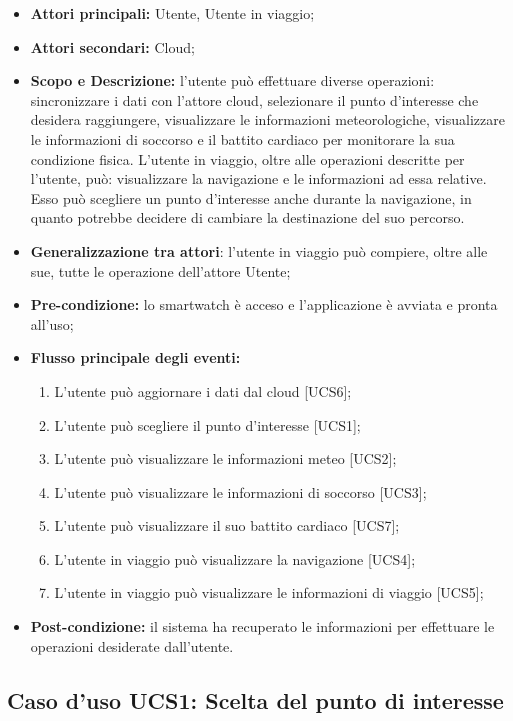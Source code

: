 \begin{itemize}
\item \textbf{Attori principali:} Utente, Utente in viaggio;
\item \textbf{Attori secondari:} Cloud;
\item \textbf{Scopo e Descrizione:} l'utente può effettuare diverse operazioni: sincronizzare i dati con l'attore cloud, selezionare il punto d'interesse che desidera raggiungere, visualizzare le informazioni meteorologiche, visualizzare le informazioni di soccorso e il battito cardiaco per monitorare la sua condizione fisica. L'utente in viaggio, oltre alle operazioni descritte per l'utente, può: visualizzare la navigazione e le informazioni ad essa relative. Esso può scegliere un punto d'interesse anche durante la navigazione, in quanto potrebbe decidere di cambiare la destinazione del suo percorso. 
\item \textbf{Generalizzazione tra attori}: l'utente in viaggio può compiere, oltre alle sue, tutte le operazione dell'attore Utente;
\item \textbf{Pre-condizione:} lo smartwatch è acceso e l'applicazione è avviata e pronta all'uso;
\item \textbf{Flusso principale degli eventi:}
\begin{enumerate}
\item L'utente può aggiornare i dati dal cloud [UCS6];
\item L'utente può scegliere il punto d'interesse [UCS1];
\item L'utente può visualizzare le informazioni meteo [UCS2];
\item L'utente può visualizzare le informazioni di soccorso [UCS3];
\item L'utente può visualizzare il suo battito cardiaco [UCS7];
\item L'utente in viaggio può visualizzare la navigazione [UCS4];
\item L'utente in viaggio può visualizzare le informazioni di viaggio [UCS5];
\end{enumerate}
\item \textbf{Post-condizione:} il sistema ha recuperato le informazioni per effettuare le operazioni desiderate dall'utente.
\end{itemize}

\subsection{Caso d'uso UCS1: Scelta del punto di interesse}


